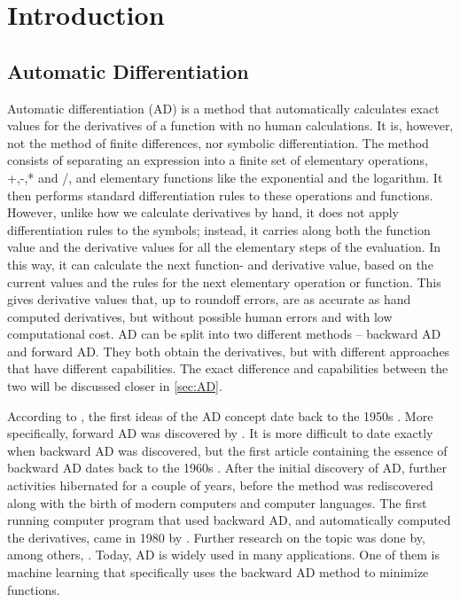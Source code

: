 \chapter{Introduction}
\section{Automatic Differentiation}
Automatic differentiation (AD) is a method that automatically calculates exact values for the derivatives of a function with no human calculations. It is, however, not the method of finite differences, nor symbolic differentiation. The method consists of separating an expression into a finite set of elementary operations, +,-,* and /, and elementary functions like the exponential and the logarithm. It then performs standard differentiation rules to these operations and functions. However, unlike how we calculate derivatives by hand, it does not apply differentiation rules to the symbols; instead, it carries along both the function value and the derivative values for all the elementary steps of the evaluation. In this way, it can calculate the next function- and derivative value, based on the current values and the rules for the next elementary operation or function. This gives derivative values that, up to roundoff errors, are as accurate as hand computed derivatives, but without possible human errors and with low computational cost. AD can be split into two different methods -- backward AD and forward AD. They both obtain the derivatives, but with different approaches that have different capabilities. The exact difference and capabilities between the two will be discussed closer in \autoref{sec:AD}. 

According to \emph{\cite{SurveyAD}}, the first ideas of the AD concept date back to the 1950s \emph{\citep{nolan1953analytical, beda1959programs}}. More specifically, forward AD was discovered by \emph{\citet{wengert1964simple}}. It is more difficult to date exactly when backward AD was discovered, but the first article containing the essence of backward AD dates back to the 1960s \emph{\citep{boltyanskii1960theory}}. After the initial discovery of AD, further activities hibernated for a couple of years, before the method was rediscovered along with the birth of modern computers and computer languages. The first running computer program that used backward AD, and automatically computed the derivatives, came in 1980 by \emph{\citet{speelpenning1980compiling}}. Further research on the topic was done by, among others, \emph{\citet{griewank1989automatic}}. Today, AD is widely used in many applications. One of them is machine learning that specifically uses the backward AD method to minimize functions. 

